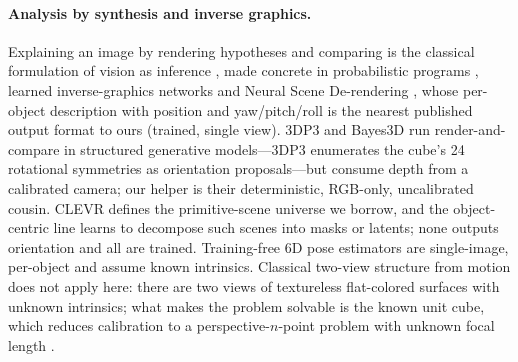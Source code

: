 \documentclass[10pt,a4paper]{article}
\begin{document}
\paragraph{Analysis by synthesis and inverse graphics.}
Explaining an image by rendering hypotheses and comparing is the classical formulation of vision as inference \citep{yuille2006vision}, made concrete in probabilistic programs \citep{kulkarni2015picture,kulkarni2014inverse}, learned inverse-graphics networks \citep{kulkarni2015deep} and Neural Scene De-rendering \citep{wu2017neural}, whose per-object description with position and yaw/pitch/roll is the nearest published output format to ours (trained, single view). 3DP3 \citep{gothoskar20213dp3} and Bayes3D \citep{gothoskar2023bayes3d} run render-and-compare in structured generative models---3DP3 enumerates the cube's 24 rotational symmetries as orientation proposals---but consume depth from a calibrated camera; our helper is their deterministic, RGB-only, uncalibrated cousin. CLEVR \citep{johnson2016clevr} defines the primitive-scene universe we borrow, and the object-centric line \citep{burgess2019monet,greff2019multi,locatello2020object,yu2021unsupervised,stelzner2021decomposing} learns to decompose such scenes into masks or latents; none outputs orientation and all are trained. Training-free 6D pose estimators \citep{wen2023foundationpose,labb2022megapose,caraffa2023freeze} are single-image, per-object and assume known intrinsics. Classical two-view structure from motion does not apply here: there are two views of textureless flat-colored surfaces with unknown intrinsics; what makes the problem solvable is the known unit cube, which reduces calibration to a perspective-$n$-point problem with unknown focal length \citep{bujnak2008general}.
\end{document}
